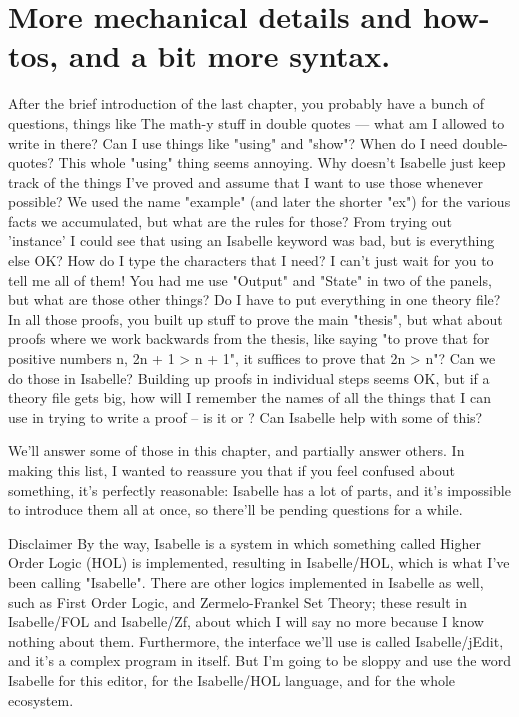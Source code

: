\chapter{More mechanical details and how-tos, and a bit more syntax.}
After the brief introduction of the last chapter, you probably have a bunch of questions, things like 
The math-y stuff in double quotes --- what am I allowed to write in there? Can I use things like "using" and "show"? 
When do I need double-quotes? 
This whole "using" thing seems annoying. Why doesn't Isabelle just keep track of the things I've proved and assume that I want to use those whenever possible? 
We used the name "example" (and later the shorter "ex") for the various facts we accumulated, but what are the rules for those? From trying out 'instance' I could see that using an Isabelle keyword was bad, but is everything else OK? 
How do I type the characters that I need? I can't just wait for you to tell me all of them!
You had me use "Output" and "State" in two of the panels, but what are those other things? 
Do I have to put everything in one theory file?
In all those proofs, you built up stuff to prove the main "thesis", but what about proofs where we work backwards from the thesis, like saying "to prove that for positive numbers n,  2n + 1 > n + 1", it suffices to prove  that 2n > n"? Can we do those in Isabelle? 
Building up proofs in individual steps seems OK, but if a theory file gets big, how will I remember the names of all the things that I can use in trying to write a proof -- is it  or ? Can Isabelle help with some of this?

We'll answer some of those in this chapter, and partially answer others. In making this list, I wanted to reassure you that if you feel confused about something, it's perfectly reasonable: Isabelle has a lot of parts, and it's impossible to introduce them all at once, so there'll be pending questions for a while.

Disclaimer
By the way, Isabelle is a system in which something called Higher Order Logic (HOL) is implemented, resulting in Isabelle/HOL, which is what I've been calling "Isabelle". There are other logics implemented in Isabelle as well, such as First Order Logic, and Zermelo-Frankel Set Theory; these result in Isabelle/FOL and Isabelle/Zf, about which I will say no more because I know nothing about them. Furthermore, the interface we'll use is called Isabelle/jEdit, and it's a complex program in itself. But I'm going to be sloppy and use the word Isabelle for this editor, for the Isabelle/HOL language, and for the whole ecosystem. 

